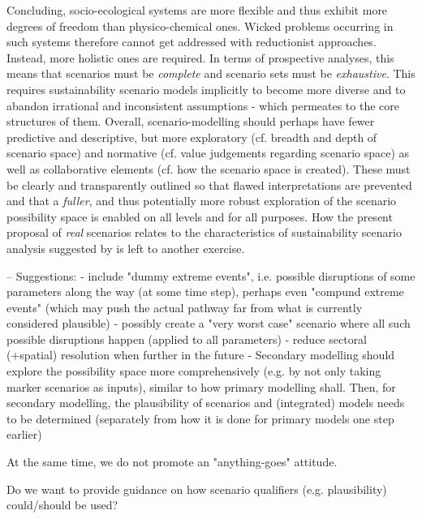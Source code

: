\documentclass{article}
\begin{document}
\begin{refsection}
Concluding, socio-ecological systems are more flexible and thus exhibit more degrees of freedom than physico-chemical ones. Wicked problems occurring in such systems therefore cannot get addressed with reductionist approaches. Instead, more holistic ones are required. In terms of prospective analyses, this means that scenarios must be \textit{complete} and scenario sets must be \textit{exhaustive}. This requires sustainability scenario models implicitly to become more diverse and to abandon irrational and inconsistent assumptions - which permeates to the core structures of them. Overall, scenario-modelling should perhaps have fewer predictive and descriptive, but more exploratory (cf. breadth and depth of scenario space) and normative (cf. value judgements regarding scenario space) as well as collaborative elements (cf. how the scenario space is created). These must be clearly and transparently outlined so that flawed interpretations are prevented and that a \textit{fuller}, and thus potentially more robust exploration of the scenario possibility space is enabled on all levels and for all purposes. How the present proposal of \textit{real} scenarios relates to the characteristics of sustainability scenario analysis suggested by \textcite{swart_2004} is left to another exercise.

--
Suggestions:
- include "dummy extreme events", i.e. possible disruptions of some parameters along the way (at some time step), perhaps even "compund extreme events" (which may push the actual pathway far from what is currently considered plausible)
- possibly create a "very worst case" scenario where all such possible disruptions happen (applied to all parameters)
- reduce sectoral (+spatial) resolution when further in the future
- Secondary modelling should explore the possibility space more comprehensively (e.g. by not only taking marker scenarios as inputs), similar to how primary modelling shall. Then, for secondary modelling, the plausibility of scenarios and (integrated) models needs to be determined (separately from how it is done for primary models one step earlier)

At the same time, we do not promote an "anything-goes" attitude. 

Do we want to provide guidance on how scenario qualifiers (e.g. plausibility) could/should be used?



\end{refsection}
\end{document}
